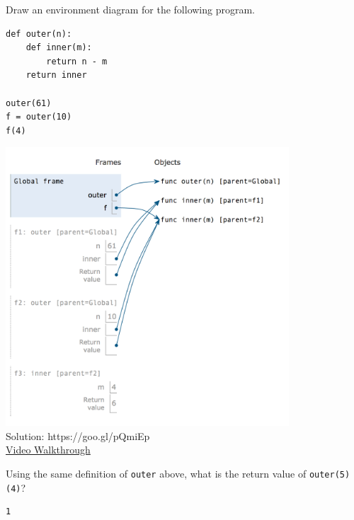 \begin{blocksection}
\question Draw an environment diagram for the following program.

\begin{lstlisting}
def outer(n):
    def inner(m):
        return n - m
    return inner

outer(61)
f = outer(10)
f(4)
\end{lstlisting}

\begin{solution}[4in]
\includegraphics[width=300pt]{env-diagram.png} \\
Solution: https://goo.gl/pQmiEp \\
\href{https://www.youtube.com/watch?v=-7hkGrqM-4g&list=PLx38hZJ5RLZfg6jvEBBtjc5fnc5BclyEb&index=5}{Video Walkthrough}
\end{solution}

\question Using the same definition of \texttt{outer} above, what is the return
value of \texttt{outer(5)(4)}?

\begin{solution}[.2in]
\begin{lstlisting}
1
\end{lstlisting}
\end{solution}
\end{blocksection}
